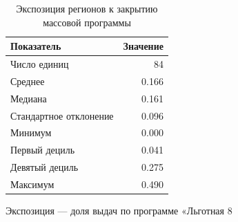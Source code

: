\begin{table}[htbp]
\centering
\small
\caption{Экспозиция регионов к закрытию массовой программы}
\label{tab:summary}
\begin{tabular}{lr}
\toprule
Показатель & Значение \\
\midrule
Число единиц & 84 \\
Среднее & 0.166 \\
Медиана & 0.161 \\
Стандартное отклонение & 0.096 \\
Минимум & 0.000 \\
Первый дециль & 0.041 \\
Девятый дециль & 0.275 \\
Максимум & 0.490 \\
\bottomrule
\end{tabular}
\par\smallskip\begin{minipage}{0.92\textwidth}\footnotesize
Экспозиция — доля выдач по программе «Льготная 8%
\end{minipage}
\end{table}
